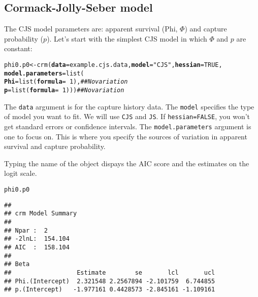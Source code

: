 \documentclass[12pt]{article}\usepackage[]{graphicx}\usepackage[]{color}
\makeatletter
\newcommand{\hlnum}[1]{\textcolor[rgb]{0.69,0.494,0}{#1}}%
\newcommand{\hlstr}[1]{\textcolor[rgb]{0.749,0.012,0.012}{#1}}%
\newcommand{\hlcom}[1]{\textcolor[rgb]{0.514,0.506,0.514}{\textit{#1}}}%
\newcommand{\hlopt}[1]{\textcolor[rgb]{0,0,0}{#1}}%
\newcommand{\hlstd}[1]{\textcolor[rgb]{0,0,0}{#1}}%
\newcommand{\hlkwb}[1]{\textcolor[rgb]{0,0.341,0.682}{#1}}%
\newcommand{\hlkwc}[1]{\textcolor[rgb]{0,0,0}{\textbf{#1}}}%
\newcommand{\hlkwd}[1]{\textcolor[rgb]{0.004,0.004,0.506}{#1}}%
\newenvironment{kframe}{%
 \def\at@end@of@kframe{}%
 \ifinner\ifhmode%
  \def\at@end@of@kframe{\end{minipage}}%
  \begin{minipage}{\columnwidth}%
 \fi\fi%
 \def\FrameCommand##1{\hskip\@totalleftmargin \hskip-\fboxsep
 \colorbox{shadecolor}{##1}\hskip-\fboxsep
     \hskip-\linewidth \hskip-\@totalleftmargin \hskip\columnwidth}%
 \MakeFramed {\advance\hsize-\width
   \@totalleftmargin\z@ \linewidth\hsize
   \@setminipage}}%
 {\par\unskip\endMakeFramed%
 \at@end@of@kframe}
\newenvironment{knitrout}{}{} %
\newcommand{\inr}[1]{\colorbox{inlinecolor}{\texttt{#1}}}
\makeatother
\begin{document}
\subsection*{Cormack-Jolly-Seber model}

The CJS model parameters are: apparent survival (Phi, $\Phi$) and capture
probability ($p$). Let's start with the simplest CJS model in which
$\Phi$ and $p$ are constant: 


\begin{knitrout}
\color{fgcolor}\begin{kframe}
\begin{alltt}
\hlstd{phi0.p0} \hlkwb{<-} \hlkwd{crm}\hlstd{(}\hlkwc{data}\hlstd{=example.cjs.data,} \hlkwc{model}\hlstd{=}\hlstr{"CJS"}\hlstd{,} \hlkwc{hessian}\hlstd{=}\hlnum{TRUE}\hlstd{,}
               \hlkwc{model.parameters}\hlstd{=}\hlkwd{list}\hlstd{(}
                   \hlkwc{Phi}\hlstd{=}\hlkwd{list}\hlstd{(}\hlkwc{formula}\hlstd{=}\hlopt{~}\hlnum{1}\hlstd{),}  \hlcom{## No variation}
                   \hlkwc{p}\hlstd{=}\hlkwd{list}\hlstd{(}\hlkwc{formula}\hlstd{=}\hlopt{~}\hlnum{1}\hlstd{)))}   \hlcom{## No variation}
\end{alltt}
\end{kframe}
\end{knitrout}

The \inr{data} argument is for the capture history data. The
\inr{model} specifies the type of model you want to fit. We will use
\texttt{CJS} and \texttt{JS}. If \inr{hessian=FALSE}, you won't get
standard errors or confidence intervals. The \inr{model.parameters}
argument is one to focus on. This is where you specify the sources of
variation in apparent survival and capture probability. 


\clearpage

Typing the name of the object dispays the AIC score and
the estimates on the logit scale.  

\begin{knitrout}\small
{}\color{fgcolor}\begin{kframe}
\begin{alltt}
\hlstd{phi0.p0}
\end{alltt}
\begin{verbatim}
## 
## crm Model Summary
## 
## Npar :  2
## -2lnL:  154.104
## AIC  :  158.104
## 
## Beta
##                  Estimate        se       lcl       ucl
## Phi.(Intercept)  2.321548 2.2567894 -2.101759  6.744855
## p.(Intercept)   -1.977161 0.4428573 -2.845161 -1.109161
\end{verbatim}
\end{kframe}
\end{knitrout}
\end{document}
